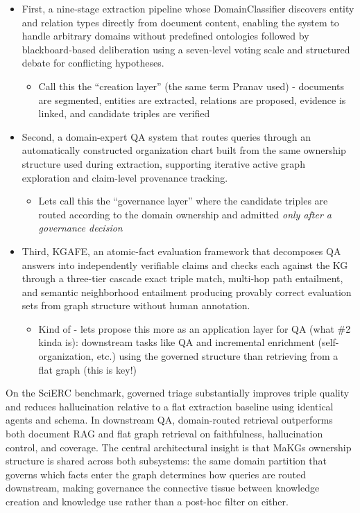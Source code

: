 \begin{itemize}
\item
  First, a nine-stage extraction pipeline whose DomainClassifier
  discovers entity and relation types directly from document content,
  enabling the system to handle arbitrary domains without predefined
  ontologies followed by blackboard-based deliberation using a
  seven-level voting scale and structured debate for conflicting
  hypotheses.

  \begin{itemize}
  \item
    Call this the ``creation layer'' (the same term Pranav used) -
    documents are segmented, entities are extracted, relations are
    proposed, evidence is linked, and candidate triples are verified
  \end{itemize}
\item
  Second, a domain-expert QA system that routes queries through an
  automatically constructed organization chart built from the same
  ownership structure used during extraction, supporting iterative
  active graph exploration and claim-level provenance tracking.

  \begin{itemize}
  \item
    Lets call this the ``governance layer'' where the candidate triples
    are routed according to the domain ownership and admitted \emph{only
    after a governance decision}
  \end{itemize}
\item
  Third, KGAFE, an atomic-fact evaluation framework that decomposes QA
  answers into independently verifiable claims and checks each against
  the KG through a three-tier cascade exact triple match, multi-hop path
  entailment, and semantic neighborhood entailment producing provably
  correct evaluation sets from graph structure without human annotation.

  \begin{itemize}
  \item
    Kind of - lets propose this more as an application layer for QA
    (what \#2 kinda is): downstream tasks like QA and incremental
    enrichment (self-organization, etc.) using the governed structure
    than retrieving from a flat graph (this is key!)
  \end{itemize}
\end{itemize}

On the SciERC benchmark, governed triage substantially improves triple
quality and reduces hallucination relative to a flat extraction baseline
using identical agents and schema. In downstream QA, domain-routed
retrieval outperforms both document RAG and flat graph retrieval on
faithfulness, hallucination control, and coverage. The central
architectural insight is that MaKG\textquotesingle s ownership structure
is shared across both subsystems: the same domain partition that governs
which facts enter the graph determines how queries are routed
downstream, making governance the connective tissue between knowledge
creation and knowledge use rather than a post-hoc filter on either.

